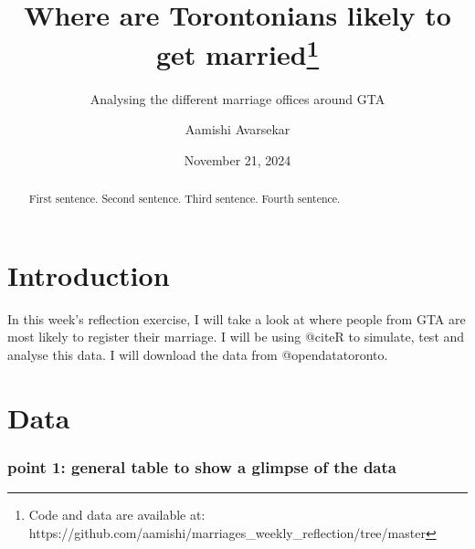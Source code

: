 \documentclass[
  letterpaper,
  DIV=11,
  numbers=noendperiod]{scrartcl}
\title{Where are Torontonians likely to get married\thanks{Code and data
are available at:
https://github.com/aamishi/marriages\_weekly\_reflection/tree/master}}
\subtitle{Analysing the different marriage offices around GTA}
\author{Aamishi Avarsekar}
\date{November 21, 2024}
\begin{document}
\maketitle
\begin{abstract}
First sentence. Second sentence. Third sentence. Fourth sentence.
\end{abstract}

\section{Introduction}\label{introduction}

In this week's reflection exercise, I will take a look at where people
from GTA are most likely to register their marriage. I will be using
@citeR to simulate, test and analyse this data. I will download the data
from @opendatatoronto.

\section{Data}\label{data}

\subsubsection{point 1: general table to show a glimpse of the
data}\label{point-1-general-table-to-show-a-glimpse-of-the-data}
\end{document}
